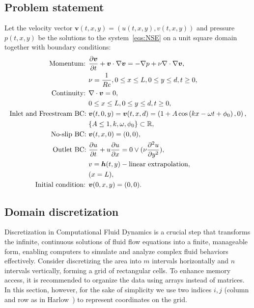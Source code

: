 \documentclass{article}
\begin{document}
\subsection{Problem statement}
Let the velocity vector $\boldsymbol{v}(t,x,y)=(u(t,x,y),v(t,x,y))$ and pressure $p(t,x,y)$ be the solutions to the system~\eqref{eqs:NSE} on a unit square domain together with boundary conditions:
\begin{subequations}
\label{eqs:NSE-dsm-bl}
\begin{align}
\label{eqn:momentum}
\text{Momentum: }	&\frac{\partial \boldsymbol{v}}{\partial t} + \boldsymbol{v} \cdot \nabla \boldsymbol{v} = -\nabla p + \nu \nabla \cdot \nabla \boldsymbol{v}, \\ 
					&\nu = \frac{1}{Re},0\leq x \leq L, 0\leq y \leq d, t\geq0,\notag\\
\label{eqn:continuity-dsm-bl}
\text{Continuity: }	& \nabla \cdot \boldsymbol{v} = 0, \\ 
					&0\leq x \leq L, 0\leq y \leq d, t\geq0, \notag\\
\label{eqn:NSE-dsm-bl-bc-freestream}
\text{Inlet and Freestream BC: } 	& \boldsymbol{v}(t,0,y)=\boldsymbol{v}(t,x,d)=\left(1 + A\cos\left( kx -\omega t + \phi_0 \right),0\right),\\
									& \{A\leq 1,k,\omega, \phi_0\}\subset \mathbb{R},\notag\\
\label{eqn:NSE-dsm-bl-bc-noslip}
\text{No-slip BC: } & \boldsymbol{v}(t,x,0)=(0,0), \\
\label{eqn:NSE-dsm-bl-bc-outlet}
\text{Outlet BC: } 	& \frac{\partial u}{\partial t}+u\frac{\partial u}{\partial x}=0\lor(\nu \frac{\partial ^2 u}{\partial y^2}), \\ 
					& v=\boldsymbol{h}(t,y)-\text{linear extrapolation},\notag\\
					& (x=L),\notag\\
\text{Initial condition: } &\boldsymbol{v}(0,x,y)=(0,0).
\end{align}
\end{subequations}

\subsection{Domain discretization}\label{subsec:dsm-domain}
Discretization in Computational Fluid Dynamics is a crucial step that transforms the infinite, continuous solutions of fluid flow equations into a finite, manageable form, enabling computers to simulate and analyze complex fluid behaviors effectively. Consider discretizing the area into $m$ intervals horizontally and $n$ intervals vertically, forming a grid of rectangular cells. To enhance memory access, it is recommended to organize the data using arrays instead of matrices. In this section, however, for the sake of simplicity we use two indices $i,j$ (column and row as in Harlow~\cite{Harlow:1965}) to represent coordinates on the grid.
\end{document}
